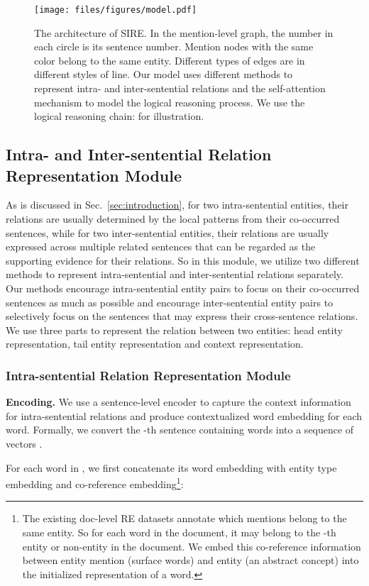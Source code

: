 \documentclass[11pt,a4paper]{article}
\begin{document}
\begin{figure*}
    \centering
    \texttt{[image: files/figures/model.pdf]}
    \caption{The architecture of SIRE. In the mention-level graph, the number in each circle is its sentence number. Mention nodes with the same color belong to the same entity. Different types of edges are in different styles of line. Our model uses different methods to represent intra- and inter-sentential relations and the self-attention mechanism to model the logical reasoning process. We use the logical reasoning chain: for illustration.}
    \label{fig:model}
\end{figure*}

\subsection{Intra- and Inter-sentential Relation Representation Module \label{ssec:intra-inter}}
As is discussed in Sec.~\ref{sec:introduction}, for two intra-sentential entities, their relations are usually determined by the local patterns from their co-occurred sentences, while for two inter-sentential entities, their relations are usually expressed across multiple related sentences that can be regarded as the supporting evidence for their relations. So in this module, we utilize two different methods to represent intra-sentential and inter-sentential relations separately. Our methods encourage intra-sentential entity pairs to focus on their co-occurred sentences as much as possible and encourage inter-sentential entity pairs to selectively focus on the sentences that may express their cross-sentence relations. We use three parts to represent the relation between two entities: head entity representation, tail entity representation and context representation.

\subsubsection{Intra-sentential Relation Representation Module\label{sssec:intra}}


\textbf{Encoding.} We use a sentence-level encoder to capture the context information for intra-sentential relations and produce contextualized word embedding for each word. Formally, we convert the -th sentence  containing  words  into a sequence of vectors .

For each word  in , we first concatenate its word embedding with entity type embedding and co-reference embedding\footnote{The existing doc-level RE datasets annotate which mentions belong to the same entity. So for each word in the document, it may belong to the -th entity or non-entity in the document. We embed this co-reference information between entity mention (surface words) and entity (an abstract concept) into the initialized representation of a word.}:
\end{document}
